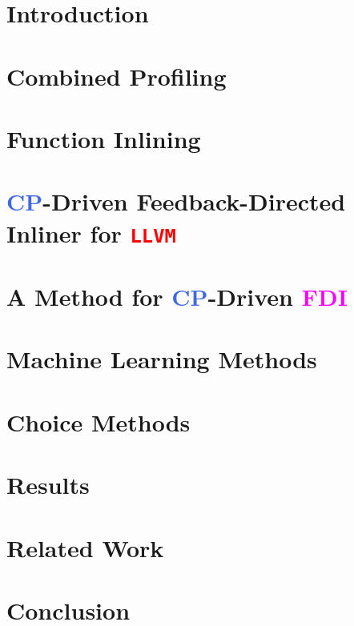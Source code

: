 \documentclass[conference]{IEEEtran}
\renewcommand{\ifColorText}[2]{\textcolor{#1}{#2}}  %
\def\llvm{{\ifColorText{Red}{{\tt LLVM}}}}
\def\CP{{\ifColorText{RoyalBlue}{CP}}}
\def\FDI{{\ifColorText{Magenta}{FDI}}}
\begin{document}
\section{Introduction}
	\label{sec:intro}
	

\section{Combined Profiling}
	\label{sec:cmbprof}
	

\section{Function Inlining}
	\label{sec:inlining}
	

\section{\CP-Driven Feedback-Directed Inliner for \llvm}
	\label{sec:fdi}
	

\section{A Method for \CP-Driven \FDI}
	\label{sec:method}
	

\section{Machine Learning Methods}
	\label{sec:ml}
	

\section{Choice Methods}
	\label{sec:choice}
	

\section{Results}
	\label{sec:results}
	

\section{Related Work}
	\label{sec:related}
	

\section{Conclusion}
	\label{sec:conclusion}
	

%	

%


\end{document}

